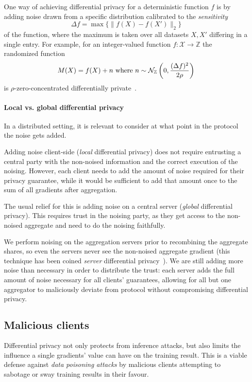\documentclass{article}
\begin{document}
One way of achieving differential privacy for a deterministic function $f$ is by adding noise drawn from a specific distribution calibrated to the \textit{sensitivity} 
$$\Delta f=\max\{\|f(X)-f(X')\|_2\}$$
of the function, where the maximum is taken over all datasets $X,X'$ differing in a single entry. For example, for an integer-valued function $f:\mathcal X\rightarrow \mathbb Z$ the randomized function
$$M(X) = f(X) + n \textnormal{ where } n \sim \mathcal N_\mathbb{Z}\left(0,\frac{(\Delta f)^2}{2\rho}\right)$$
is $\rho$-zero-concentrated differentially private~\cite[Proposition 1.6]{DBLP:journals/corr/abs-2004-00010}.

\paragraph{Local vs. global differential privacy} In a distributed setting, it is relevant to consider at what point in the protocol the noise gets added.

Adding noise client-side (\textit{local} differential privacy) does not require entrusting a central party with the non-noised information and the correct execution of the noising. However, each client needs to add the amount of noise required for their privacy guarantee, while it would be sufficient to add that amount once to the sum of all gradients after aggregation.

The usual relief for this is adding noise on a central server (\textit{global} differential privacy). This requires trust in the noising party, as they get access to the non-noised aggregate and need to do the noising faithfully.

We perform noising on the aggregation servers prior to recombining the aggregate shares, so even the servers never see the non-noised aggregate gradient (this technique has been coined \emph{server} differential privacy~\cite{dprio}). We are still adding more noise than necessary in order to distribute the trust: each server adds the full amount of noise necessary for all clients' guarantees, allowing for all but one aggregator to maliciously deviate from protocol without compromising differential privacy.

\subsection{Malicious clients}
Differential privacy not only protects from inference attacks, but also limits the influence a single gradients' value can have on the training result. This is a viable defense against \textit{data poisoning attacks} by malicious clients attempting to sabotage or sway training results in their favour.
\end{document}
